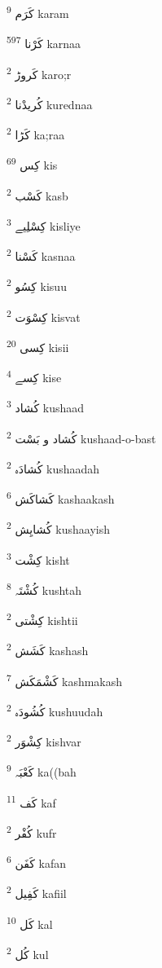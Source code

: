 \documentclass[12pt]{article}
\begin{document}
\begin{RTL}
\begin{multicols}{5}
{\ur کَرَم}   \textsuperscript{9} karam

{\ur کَرْنا}   \textsuperscript{597} karnaa

{\ur کَروڑ}   \textsuperscript{2} karo;r

{\ur کُریدْنا}   \textsuperscript{2} kurednaa

{\ur کَڑا}   \textsuperscript{2} ka;raa

{\ur کِس}   \textsuperscript{69} kis

{\ur کَسْب}   \textsuperscript{2} kasb

{\ur کِسْلِیے}   \textsuperscript{3} kisliye

{\ur کَسْنا}   \textsuperscript{2} kasnaa

{\ur کِسُو}   \textsuperscript{2} kisuu

{\ur کِسْوَت}   \textsuperscript{2} kisvat

{\ur کِسی}   \textsuperscript{20} kisii

{\ur کِسے}   \textsuperscript{4} kise

{\ur کُشاد}   \textsuperscript{3} kushaad

{\ur کُشاد و بَسْت}   \textsuperscript{2} kushaad-o-bast

{\ur کُشادَہ}   \textsuperscript{2} kushaadah

{\ur کَشاکَش}   \textsuperscript{6} kashaakash

{\ur کُشایِش}   \textsuperscript{2} kushaayish

{\ur کِشْت}   \textsuperscript{3} kisht

{\ur کُشْتَہ}   \textsuperscript{8} kushtah

{\ur کِشْتی}   \textsuperscript{2} kishtii

{\ur کَشَش}   \textsuperscript{2} kashash

{\ur کَشْمَکَش}   \textsuperscript{7} kashmakash

{\ur کُشُودَہ}   \textsuperscript{2} kushuudah

{\ur کِشْوَر}   \textsuperscript{2} kishvar

{\ur کَعْبَہ}   \textsuperscript{9} ka((bah

{\ur کَف}   \textsuperscript{11} kaf

{\ur کُفْر}   \textsuperscript{2} kufr

{\ur کَفَن}   \textsuperscript{6} kafan

{\ur کَفِیل}   \textsuperscript{2} kafiil

{\ur کَل}   \textsuperscript{10} kal

{\ur کُل}   \textsuperscript{2} kul


\end{multicols}
\end{RTL}
\end{document}
